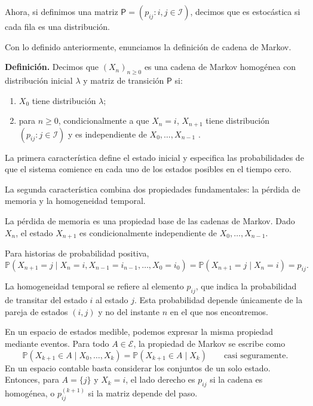 Ahora, si definimos una matriz $\mathsf P = (p_{ij} : i, j \in \mathcal I)$, decimos que es estocástica si cada fila es una distribución.

Con lo definido anteriormente, enunciamos la  definición de cadena de Markov.

\textbf{Definición.} Decimos que $(X_n)_{n \geq 0}$ es una cadena de Markov homogénea con distribución inicial $\lambda$ y matriz de transición $\mathsf P$ si:
\begin{enumerate}
    \item[(i)] $X_0$ tiene distribución $\lambda$;
    \item[(ii)] para $n \geq 0$, condicionalmente a que $X_n = i$, $X_{n+1}$ tiene distribución $(p_{ij} : j \in \mathcal I)$ y es independiente de $X_0, \ldots, X_{n-1}$ \cite{Norris}.
\end{enumerate}

La primera característica define el estado inicial y especifica las probabilidades de que el sistema comience en cada uno de los estados posibles en el tiempo cero.

La segunda característica combina dos propiedades fundamentales: la pérdida de memoria y la homogeneidad temporal.

La pérdida de memoria es una propiedad base de las cadenas de Markov. Dado $X_n$, el estado $X_{n+1}$ es condicionalmente independiente de $X_0,\ldots,X_{n-1}$.

Para historias de probabilidad positiva,
\[
\mathbb P(X_{n+1} = j \mid X_n = i, X_{n-1} = i_{n-1}, \ldots, X_0 = i_0) = \mathbb P(X_{n+1} = j \mid X_n = i) = p_{ij}.
\]

La homogeneidad temporal se refiere al elemento $p_{ij}$, que indica la probabilidad de transitar del estado $i$ al estado $j$. Esta probabilidad depende únicamente de la pareja de estados $(i, j)$ y no del instante $n$ en el que nos encontremos.




En un espacio de estados medible, podemos expresar la misma propiedad mediante eventos. Para todo $A\in\mathcal E$, la propiedad de Markov se escribe como
\begin{equation}
\label{eq:markov}
    \mathbb P(X_{k+1}\in A\mid X_0,\ldots,X_k)
    =\mathbb P(X_{k+1}\in A\mid X_k)
    \qquad \text{casi seguramente}.
\end{equation}
En un espacio contable basta considerar los conjuntos de un solo estado. Entonces, para $A=\{j\}$ y $X_k=i$, el lado derecho es $p_{ij}$ si la cadena es homogénea, o $p_{ij}^{(k+1)}$ si la matriz depende del paso.


